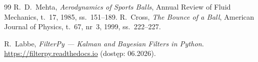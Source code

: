 \documentclass[14pt,a4paper]{extarticle}
\begin{document}
\begin{thebibliography}{99}
 R.~D.~Mehta, \emph{Aerodynamics of Sports Balls}, Annual Review of Fluid
  Mechanics, t.~17, 1985, ss.~151--189.
 R.~Cross, \emph{The Bounce of a Ball}, American Journal of Physics, t.~67,
  nr~3, 1999, ss.~222--227.

 R.~Labbe, \emph{FilterPy --- Kalman and Bayesian Filters in Python}.
  \url{https://filterpy.readthedocs.io} (dostęp: 06.2026).
\end{thebibliography}

\clearpage
{}
\listoffigures
{}
\listoftables
\end{document}
